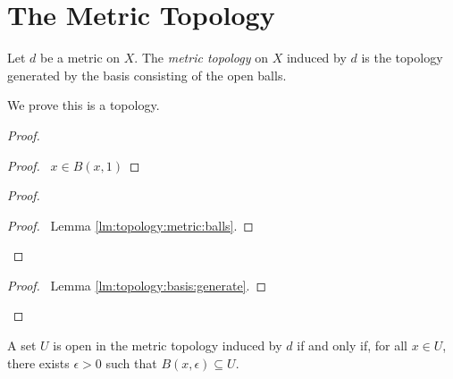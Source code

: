 \section{The Metric Topology}

\begin{df}
  Let $d$ be a metric on $X$. The \emph{metric topology} on $X$ induced by
  $d$ is the topology generated by the basis consisting of the open balls.

  We prove this is a topology.
\end{df}

\begin{proof}
  \pf
  \begin{proof}
    \pf\ $x \in B(x, 1)$
  \end{proof}
  \begin{proof}
    \begin{proof}
      \pf\ Lemma \ref{lm:topology:metric:balls}.
    \end{proof}
  \end{proof}
  \qedstep
  \begin{proof}
    \pf\ Lemma \ref{lm:topology:basis:generate}.
  \end{proof}
\end{proof}

\begin{lm}
  \label{lm:topology:metric:open}
  A set $U$ is open in the metric topology induced by $d$ if and only if, for
  all $x \in U$, there exists $\epsilon > 0$ such that $B(x, \epsilon)
  \subseteq
  U$.
\end{lm}

